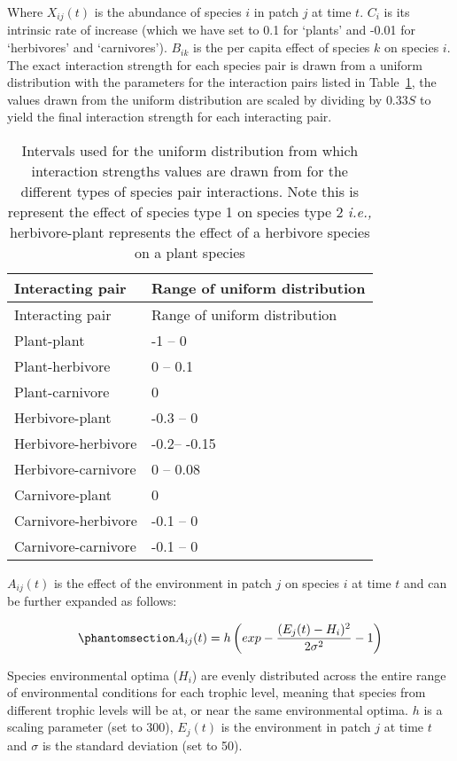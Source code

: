 \documentclass[
]{agujournal2019}
\begin{document}
Where \(X_{ij}(t)\) is the abundance of species \(i\) in patch \(j\) at
time \(t\). \(C_i\) is its intrinsic rate of increase (which we have set
to 0.1 for `plants' and -0.01 for `herbivores' and `carnivores').
\(B_{ik}\) is the per capita effect of species \(k\) on species \(i\).
The exact interaction strength for each species pair is drawn from a
uniform distribution with the parameters for the interaction pairs
listed in Table~\ref{tbl-interaction_strength}, the values drawn from
the uniform distribution are scaled by dividing by \(0.33S\) to yield
the final interaction strength for each interacting pair.

\begin{longtable}[]{@{}ll@{}}
\caption{Intervals used for the uniform distribution from which
interaction strengths values are drawn from for the different types of
species pair interactions. Note this is represent the effect of species
type 1 on species type 2 \emph{i.e.,} herbivore-plant represents the
effect of a herbivore species on a plant
species}\label{tbl-interaction_strength}\tabularnewline
\toprule\noalign{}
Interacting pair & Range of uniform distribution \\
\midrule\noalign{}
\endfirsthead
\toprule\noalign{}
Interacting pair & Range of uniform distribution \\
\midrule\noalign{}
\endhead
\bottomrule\noalign{}
\endlastfoot
Plant-plant & -1 -- 0 \\
Plant-herbivore & 0 -- 0.1 \\
Plant-carnivore & 0 \\
Herbivore-plant & -0.3 -- 0 \\
Herbivore-herbivore & -0.2-- -0.15 \\
Herbivore-carnivore & 0 -- 0.08 \\
Carnivore-plant & 0 \\
Carnivore-herbivore & -0.1 -- 0 \\
Carnivore-carnivore & -0.1 -- 0 \\
\end{longtable}

\(A_{ij}(t)\) is the effect of the environment in patch \(j\) on species
\(i\) at time \(t\) and can be further expanded as follows:

\begin{equation}\phantomsection\label{eq-metacomm_env}{
A_{ij}(t)=h\left(exp-\frac{(E_{j}(t)-H_{i})^2}{2\sigma^2}-1\right)
}\end{equation}

Species environmental optima (\(H_i\)) are evenly distributed across the
entire range of environmental conditions for each trophic level, meaning
that species from different trophic levels will be at, or near the same
environmental optima. \(h\) is a scaling parameter (set to 300),
\(E_j(t)\) is the environment in patch \(j\) at time \(t\) and
\(\sigma\) is the standard deviation (set to 50).
\end{document}

